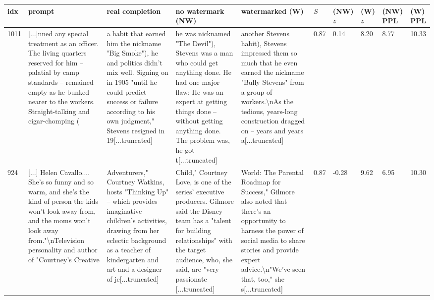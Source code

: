 \documentclass{article}
\theoremstyle{plain}
\theoremstyle{definition}
\theoremstyle{remark}
\begin{document}
\begin{table}[ht]
\tiny
\begin{tabular}{p{0.2cm}|p{2.75cm}|p{2.75cm}|p{2.75cm}|p{2.75cm}|p{0.2cm}|p{0.42cm}|p{0.42cm}|p{0.3cm}|p{0.3cm}}
\toprule
 idx &  prompt & real completion &  no watermark (NW) &  watermarked (W) &  $S$ &  (NW) $z$ &  (W) $z$ &  (NW) PPL &  (W) PPL \\
\midrule
1011 &  [...]nned any special treatment as an officer. The living quarters reserved for him -- palatial by camp standards -- remained empty as he bunked nearer to the workers. Straight-talking and cigar-chomping ( &   a habit that earned him the nickname "Big Smoke"), he and politics didn't mix well. Signing on in 1905 "until he could predict success or failure according to his own judgment," Stevens resigned in 19[...truncated] &  he was nicknamed "The Devil"), Stevens was a man who could get anything done. He had one major flaw: He was an expert at getting things done -- without getting anything done. The problem was, he got t[...truncated] &  another Stevens habit), Stevens impressed them so much that he even earned the nickname "Bully Stevens" from a group of workers.\textbackslash nAs the tedious, years-long construction dragged on -- years and years a[...truncated] &               0.87 &           0.14 &          8.20 &       8.77 &     10.33 \\\midrule
 924 & [...] Helen Cavallo.... She's so funny and so warm, and she's the kind of person the kids won't look away from, and the moms won't look away from."\textbackslash nTelevision personality and author of "Courtney's Creative &    Adventurers," Courtney Watkins, hosts "Thinking Up" -- which provides imaginative children's activities, drawing from her eclectic background as a teacher of kindergarten and art and a designer of je[...truncated] &   Child," Courtney Love, is one of the series' executive producers. Gilmore said the Disney team has a "talent for building relationships" with the target audience, who, she said, are "very passionate [...truncated] &   World: The Parental Roadmap for Success," Gilmore also noted that there's an opportunity to harness the power of social media to share stories and provide expert advice.\textbackslash n"We've seen that, too," she s[...truncated] &               0.87 &          -0.28 &          9.62 &       6.95 &     10.30 \\\midrule

\end{tabular}
\end{table}
\end{document}
